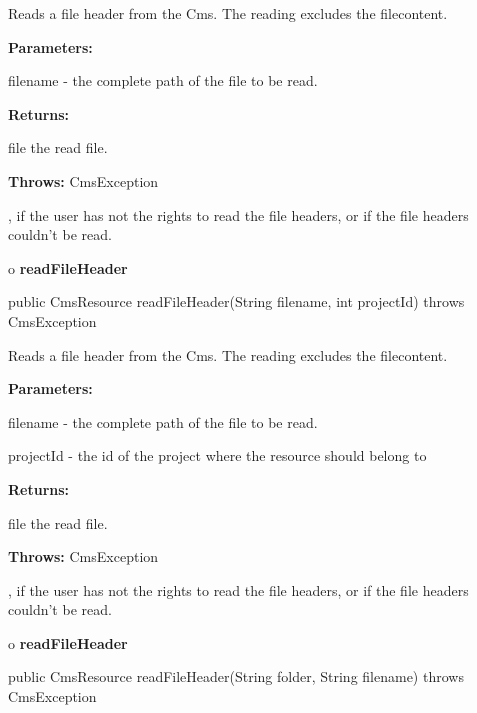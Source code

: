 \begin{description}
\htmlDD Reads a file header from the Cms. \htmlBR
The reading excludes the filecontent.

\begin{description}
\item {\bf Parameters:}

filename - the complete path of the file to be read.
\item {\bf Returns:}

file the read file.
\item {\bf Throws:} CmsException

, if the user has not the rights to read the file headers, or if the file
headers couldn't be read.
\end{description}

\end{description}

o {\bf readFileHeader}

\begin{PRE}
 public CmsResource readFileHeader(String filename,
                                   int projectId) throws CmsException
\end{PRE}

\begin{description}
\htmlDD Reads a file header from the Cms. \htmlBR
The reading excludes the filecontent.

\begin{description}
\item {\bf Parameters:}

filename - the complete path of the file to be read.

projectId - the id of the project where the resource should belong to
\item {\bf Returns:}

file the read file.
\item {\bf Throws:} CmsException

, if the user has not the rights to read the file headers, or if the file
headers couldn't be read.
\end{description}

\end{description}

o {\bf readFileHeader}

\begin{PRE}
 public CmsResource readFileHeader(String folder,
                                   String filename) throws CmsException
\end{PRE}

